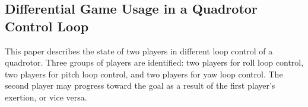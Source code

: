 \documentclass[conference]{IEEEtran}
\begin{document}
\subsection{Differential Game Usage in a Quadrotor Control Loop}
This paper describes the state of two players in different loop control of a quadrotor.
Three groups of players are identified: two players for roll loop control, two players for pitch loop control, and two players for yaw loop control.
The second player may progress toward the goal as a result of the first player's exertion, or vice versa.
\end{document}
